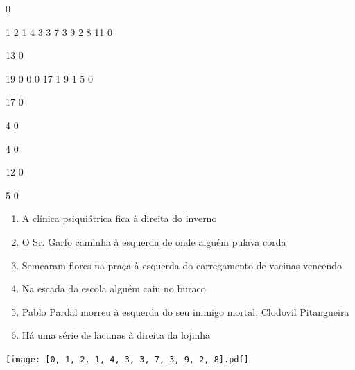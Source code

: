 \documentclass[12pt]{article}
\begin{document}
		\vfill  
		  
{
	0	%

	1	%
	2	%
	1	%
	4	%
	3	%
	3	%
	7	%
	3	%
	9	%
	2	%
	8	%
	11	%
	0	%

	13	%
	0	%

	19	%
	0	%
	0	%
	0	%
	17	%
	1	%
	9	%
	1	%
	5	%
	0	%

	17	%
	0	%

	4	%
	0	%

	4	%
	0	%

	12	%
	0	%

	5	%
	0	%

}	  
		    	

		 

\pagebreak


	\begin{enumerate}
		  \sffamily %
		  \large %


\vfill \item
A clínica psiquiátrica fica	%
à direita
do inverno	%

\vfill \item
O Sr. Garfo caminha	%
à esquerda
de onde alguém pulava corda	%

\vfill \item
Semearam flores na praça	%
à esquerda
do carregamento de vacinas vencendo	%

\vfill \item
Na escada da escola	%
alguém caiu no buraco	%

\vfill \item
Pablo Pardal morreu	%
à esquerda
do seu inimigo mortal, Clodovil Pitangueira	%

\vfill \item
Há uma série de lacunas	%
à direita
da lojinha	%
	\end{enumerate}
		  
		  \hfill

		  \vfill

\texttt{[image: [0, 1, 2, 1, 4, 3, 3, 7, 3, 9, 2, 8].pdf]}


	\hfill	  	  

\end{document}
